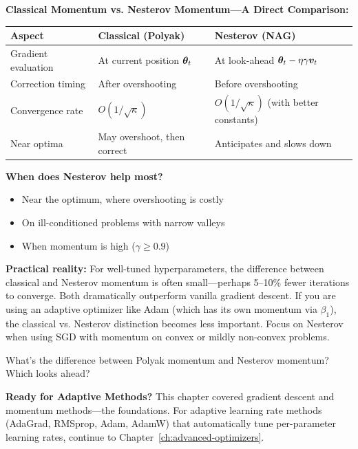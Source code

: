 \documentclass[../../main.tex]{subfiles}
\begin{document}
\begin{keyconcept}
\textbf{Classical Momentum vs. Nesterov Momentum---A Direct Comparison:}

\begin{center}
\begin{tabular}{lll}
\toprule
\textbf{Aspect} & \textbf{Classical (Polyak)} & \textbf{Nesterov (NAG)} \\
\midrule
Gradient evaluation & At current position $\boldsymbol{\theta}_t$ & At look-ahead $\boldsymbol{\theta}_t - \eta\gamma\boldsymbol{v}_t$ \\
Correction timing & After overshooting & Before overshooting \\
Convergence rate & $O(1/\sqrt{\kappa})$ & $O(1/\sqrt{\kappa})$ (with better constants) \\
Near optima & May overshoot, then correct & Anticipates and slows down \\
\bottomrule
\end{tabular}
\end{center}

\textbf{When does Nesterov help most?}
\begin{itemize}
    \item Near the optimum, where overshooting is costly
    \item On ill-conditioned problems with narrow valleys
    \item When momentum is high ($\gamma \geq 0.9$)
\end{itemize}

\textbf{Practical reality:} For well-tuned hyperparameters, the difference between classical and Nesterov momentum is often small---perhaps 5--10\% fewer iterations to converge. Both dramatically outperform vanilla gradient descent. If you are using an adaptive optimizer like Adam (which has its own momentum via $\beta_1$), the classical vs. Nesterov distinction becomes less important. Focus on Nesterov when using SGD with momentum on convex or mildly non-convex problems.
\end{keyconcept}

\begin{checkpoint}
What's the difference between Polyak momentum and Nesterov momentum? Which looks ahead?
\end{checkpoint}

\begin{important}
\textbf{Ready for Adaptive Methods?} This chapter covered gradient descent and momentum methods---the foundations. For adaptive learning rate methods (AdaGrad, RMSprop, Adam, AdamW) that automatically tune per-parameter learning rates, continue to Chapter~\ref{ch:advanced-optimizers}.
\end{important}
\end{document}
